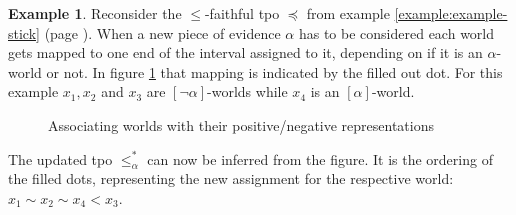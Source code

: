 \documentclass[english, 12pt]{scrartcl}
\theoremstyle{definition}
\newtheorem{example}{Example}[section]
\theoremstyle{definition}
\theoremstyle{definition}
\begin{document}
\begin{example}
    \label{example:example-updated-tpo}
    Reconsider the $\leq$-faithful tpo $\preceq$ from example \ref{example:example-stick} (page \pageref{example:example-stick}). When a new piece of evidence $\alpha$ has to be considered each world gets mapped to one end of the interval assigned to it, depending on if it is an $\alpha$-world or not. In figure \ref{fig:example-updated-tpo} that mapping is indicated by the filled out dot. For this example $x_{1}, x_{2}$ and $x_{3}$ are $[\neg\alpha]$-worlds while $x_{4}$ is an $[\alpha]$-world.

    \begin{figure}[h]
        \centering
        \caption{Associating worlds with their positive/negative representations}
        \label{fig:example-updated-tpo}
    \end{figure}
    
    The updated tpo $\leq_{\alpha}^{\ast}$ can now be inferred from the figure. It is the ordering of the filled dots, representing the new assignment for the respective world: $x_{1} \sim x_{2} \sim x_{4} < x_{3}$.
\end{example}
\end{document}
